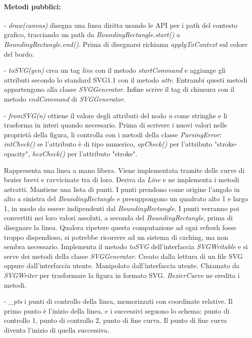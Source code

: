 \paragraph{Metodi pubblici:}
\begin{elencopuntato}[\subsubsecindent]
\item[-] \textit{draw(canvas)} disegna una linea diritta usando le API per i path del contesto grafico, tracciando un path da \textit{BoundingRectangle.start()} a \textit{BoundingRectangle.end()}. Prima di disegnarsi richiama \textit{applyToContext} sul colore del bordo.
\item[-] \textit{toSVG(gen)} crea un tag \textit{line} con il metodo \textit{startCommand} e aggiunge gli attributi secondo lo standard SVG1.1 con il metodo \textit{attr}. Entrambi questi metodi appartengono alla classe \textit{SVGGenerator}. Infine scrive il tag di chiusura con il metodo \textit{endCommand} di \textit{SVGGenerator}.
\item[-] \textit{fromSVG(n)} ottiene il valore degli attributi del nodo \textit{n} come stringhe e li trasforma in interi quando necessario. Prima di scrivere i nuovi valori nelle propriet\`a della figura, li controlla con i metodi della classe \textit{ParsingError}: \textit{intCheck()} se l'attributo \`e di tipo numerico, \textit{opCheck()} per l'attributo "stroke-opacity",  \textit{hexCheck()} per l'attributo "stroke".
\end{elencopuntato}

Rappresenta una linea a mano libera. Viene implementata tramite delle curve di bezier brevi e ravvicinate tra di loro.
Deriva da \textit{Line} e ne implementa i metodi astratti. Mantiene una lista di punti. I punti prendono come origine l'angolo in alto a sinistra del \textit{BoundingRectangle} e presuppongono un quadrato alto 1 e largo 1, in modo da essere indipendenti dal \textit{BoundingRectangle}. I punti verranno poi convertiti nei loro valori assoluti, a seconda del \textit{BoundingRectangle}, prima di disegnare la linea. Qualora ripetere questa computazione ad ogni refresh fosse troppo dispendioso, si potrebbe ricorrere ad un sistema di caching, ma non sembra necessario. Implementa il metodo \textit{toSVG} dell'interfaccia \textit{SVGWritable} e si serve dei metodi della classe \textit{SVGGenerator}.
Creato dalla lettura di un file SVG oppure dall'interfaccia utente. Manipolato dall'interfaccia utente. Chiamato da \textit{SVGWriter} per trasformare la figura in formato SVG. \textit{BezierCurve} ne eredita i metodi.
\begin{elencopuntato}[\subsubsecindent]
\item[-] \textit{{\_}pts} i punti di controllo della linea, memorizzati con coordinate relative. Il primo punto \`e l'inizio della linea, e i successivi seguono lo schema: punto di controllo 1, punto di controllo 2, punto di fine curva. Il punto di fine curva diventa l'inizio di quella successiva.
\end{elencopuntato}
